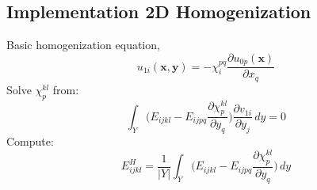 \documentclass[10pt]{article}
\begin{document}
\subsection{Implementation 2D Homogenization}
Basic homogenization equation, 
\begin{equation}
u_{1i}(\textbf{x},\textbf{y}) = -\chi^{pq}_i\frac{\partial u_{0p}(\textbf{x})}{\partial x_q}
\end{equation}
Solve $\chi^{kl}_p$ from:
\begin{equation}
\int_Y \bigg ( E_{ijkl} - E_{ijpq}\frac{\partial\chi^{kl}_p}{\partial y_q}\bigg ) \frac{\partial v_{1i}}{\partial y_j}\,dy = 0
\end{equation}
Compute:
\begin{equation}\label{homoE}
E_{ijkl}^H=\frac{1}{|Y|}\int_Y\bigg (E_{ijkl} - E_{ijpq}\frac{\partial\chi^{kl}_p}{\partial y_q}\bigg )\,dy
\end{equation}
\end{document}
